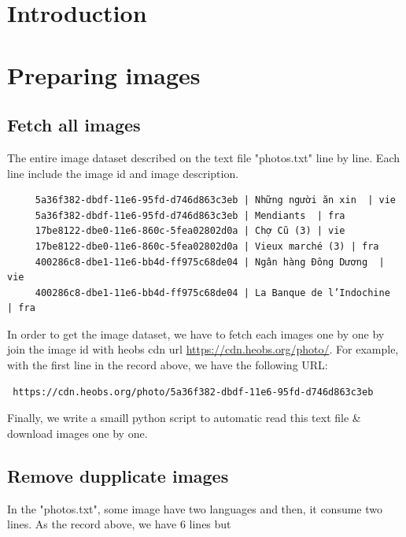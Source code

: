 \documentclass[11pt]{article}
\begin{document}
\section{Introduction}
\section{Preparing images}
\subsection{Fetch all images}
The entire image dataset described on the text file "photos.txt" line by line. Each line include the image id and image description. 
\begin{verbatim}
	 5a36f382-dbdf-11e6-95fd-d746d863c3eb | Những người ăn xin  | vie
	 5a36f382-dbdf-11e6-95fd-d746d863c3eb | Mendiants  | fra
	 17be8122-dbe0-11e6-860c-5fea02802d0a | Chợ Cũ (3) | vie
	 17be8122-dbe0-11e6-860c-5fea02802d0a | Vieux marché (3) | fra
	 400286c8-dbe1-11e6-bb4d-ff975c68de04 | Ngân hàng Đông Dương  | vie
	 400286c8-dbe1-11e6-bb4d-ff975c68de04 | La Banque de l’Indochine  | fra
\end{verbatim}
In order to get the image dataset, we have to fetch each images one by one by join the image id with heobs cdn url \href{https://cdn.heobs.org/photo/}{https://cdn.heobs.org/photo/}. For example, with the first line in the record above, we have the following URL: 
\begin{verbatim}
 https://cdn.heobs.org/photo/5a36f382-dbdf-11e6-95fd-d746d863c3eb
\end{verbatim}
Finally, we write a smaill python script to automatic read this text file \& download images one by one.

\subsection{Remove dupplicate images}
In the "photos.txt", some image have two languages and then, it consume two lines. As the record above, we have 6 lines but 
\end{document}
